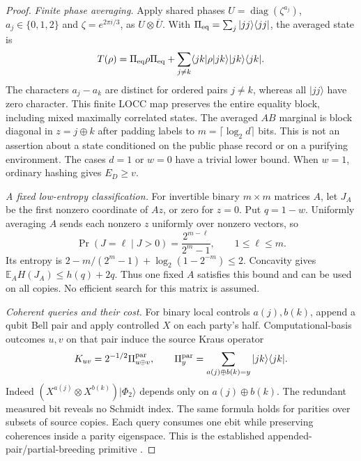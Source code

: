 \documentclass[11pt]{article}
\begin{document}
\begin{proof}
\emph{Finite phase averaging.} Apply shared phases
$U=\operatorname{diag}(\zeta^{a_j})$, $a_j\in\{0,1,2\}$ and
$\zeta=e^{2\pi i/3}$, as $U\otimes\overline U$.
With $\Pi_{\rm eq}=\sum_j|jj\rangle\langle jj|$, the averaged state is
\begin{equation}\label{eq:twirl}
 T(\rho)=\Pi_{\rm eq}\rho\Pi_{\rm eq}
       +\sum_{j\ne k}\langle jk|\rho|jk\rangle|jk\rangle\langle jk|.
\end{equation}
The characters $a_j-a_k$ are distinct for ordered pairs $j\ne k$,
whereas all $|jj\rangle$ have zero character. This finite LOCC map
preserves the entire equality block, including mixed maximally
correlated states. The averaged $AB$ marginal is block diagonal in
$z=j\mathbin\oplus k$ after padding labels to $m=\lceil\log_2d\rceil$
bits. This is not an assertion about a state conditioned on the public
phase record or on a purifying environment. The cases $d=1$ or $w=0$
have a trivial lower bound. When $w=1$, ordinary hashing gives $E_D\ge v$.

\emph{A fixed low-entropy classification.} For invertible binary
$m\times m$ matrices $A$, let $J_A$ be the first nonzero coordinate
of $Az$, or zero for $z=0$. Put $q=1-w$. Uniformly averaging $A$
sends each nonzero $z$ uniformly over nonzero vectors, so
\[
 \Pr(J=\ell\mid J>0)=\frac{2^{m-\ell}}{2^m-1},\qquad 1\le\ell\le m.
\]
Its entropy is $2-m/(2^m-1)+\log_2(1-2^{-m})\le2$.
Concavity gives $\mathbb E_A H(J_A)\le h(q)+2q$.
Thus one fixed $A$ satisfies this bound and can be used on all copies.
No efficient search for this matrix is assumed.

\emph{Coherent queries and their cost.} For binary local controls
$a(j),b(k)$, append a qubit Bell pair and apply controlled $X$ on
each party's half. Computational-basis outcomes $u,v$ on that pair
induce the source Kraus operator
\begin{equation}\label{eq:kraus}
 K_{uv}=2^{-1/2}\Pi^{\rm par}_{u\oplus v},\qquad
 \Pi^{\rm par}_y=\sum_{a(j)\oplus b(k)=y}|jk\rangle\langle jk|.
\end{equation}
Indeed $(X^{a(j)}\otimes X^{b(k)})|\Phi_2\rangle$
depends only on $a(j)\oplus b(k)$. The redundant measured bit reveals
no Schmidt index. The same formula holds for parities over subsets
of source copies. Each query consumes one ebit while preserving
coherences inside a parity eigenspace. This is the established
appended-pair/partial-breeding primitive \cite{hostens,vv}.


\end{proof}
\end{document}
